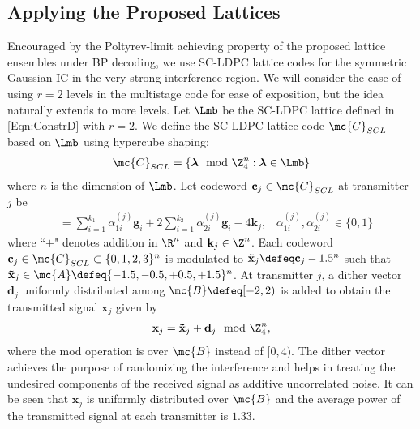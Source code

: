 \documentclass[conference]{IEEEtran}
\begin{document}
\subsection{Applying the Proposed Lattices}
Encouraged by the Poltyrev-limit achieving property of the proposed lattice ensembles under BP decoding, we use SC-LDPC lattice codes for the symmetric Gaussian IC in the very strong interference region. We will consider the case of using $r=2$ levels in the multistage code for ease of exposition, but the idea naturally extends to more levels. Let $\Lmb$ be the SC-LDPC lattice defined in \eqref{Eqn:ConstrD} with $r=2$.
We define the SC-LDPC lattice code $\mc{C}_{SCL}$ based on $\Lmb$ using hypercube shaping:
\begin{align}
\mc{C}_{SCL}=\left\lbrace \mathbf{\boldsymbol\lambda} \mod \Z_{4}^{n}: \mathbf{\boldsymbol\lambda} \in \Lmb \right\rbrace
\end{align}
where $n$ is the dimension of $\Lmb$. Let codeword $\mathbf{c}_{j}\in\mc{C}_{SCL}$ at transmitter $j$ be
\begin{align}
\label{Eqn:SICCodeword}
&= \sum_{i=1}^{k_{1}}\alpha_{1i}^{(j)}\mathbf{g}_i\!+\! 2\sum_{i=1}^{k_{2}}\alpha_{2i}^{(j)}\mathbf{g}_i\! -\! 4\mathbf{k}_{j}, \hspace{10pt} \alpha_{1i}^{(j)},\alpha_{2i}^{(j)}\! \in \{0,1\}
\end{align}
where ``$+$" denotes addition in $\R^{n}$ and $\mathbf{k}_{j}\in\Z^{n}$. Each codeword $\mathbf{c}_{j}\in\mc{C}_{SCL}\subset\{0,1,2,3\}^{n}$ is modulated to $\mathbf{\tilde{x}}_{j}\defeq \mathbf{c}_{j}-1.5^{n}$ such that $\mathbf{\tilde{x}}_{j}\in\mc{A}\defeq\{-1.5,-0.5,+0.5,+1.5\}^{n}$. At transmitter $j$, a dither vector $\mathbf{d}_{j}$ uniformly distributed among $\mc{B}\defeq [-2,2)$ is added to obtain the transmitted signal $\mathbf{x}_j$ given by
\begin{align}
\mathbf{x}_{j}=\mathbf{\tilde{x}}_{j}+\mathbf{d}_{j} \mod \Z_{4}^{n},
\label{Eqn:SICdither}
\end{align}
where the mod operation is over $\mc{B}$ instead of $[0,4)$. The dither vector achieves the purpose of randomizing the interference and helps in treating the undesired components of the received signal as additive uncorrelated noise. It can be seen that $\mathbf{x}_{j}$ is uniformly distributed over $\mc{B}$ and the average power of the transmitted signal at each transmitter is $1.33$.
\end{document}

